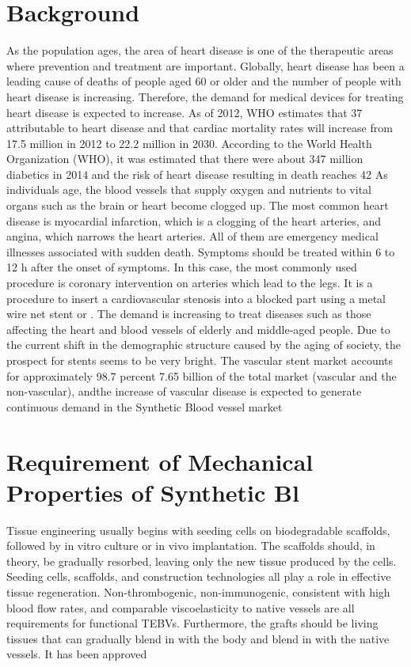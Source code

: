 \documentclass[12pt,letterpaper]{article}
\begin{document}
\begin{Summary}
\section{Background}
As the population ages, the area of heart disease is one of the therapeutic areas where
prevention and treatment are important. Globally, heart disease has been a leading cause of
deaths of people aged 60 or older and the number of people with heart disease is increasing.
Therefore, the demand for medical devices for treating heart disease is expected to increase.
As of 2012, WHO estimates that 37%
attributable to heart disease and that cardiac mortality rates will increase from 17.5 million in
2012 to 22.2 million in 2030. According to the World Health Organization (WHO), it was
estimated that there were about 347 million diabetics in 2014 and the risk of heart disease
resulting in death reaches 42%
As individuals age, the blood vessels that supply oxygen and nutrients to vital organs such as
the brain or heart become clogged up. The most common heart disease is myocardial infarction,
which is a clogging of the heart arteries, and angina, which narrows the heart arteries. All of
them are emergency medical illnesses associated with sudden death. Symptoms should be
treated within 6 to 12 h after the onset of symptoms. In this case, the most commonly used
procedure is coronary intervention on arteries which lead to the legs. It is a procedure to insert a
cardiovascular stenosis into a blocked part using a metal wire net stent or . The demand is
increasing to treat diseases such as those affecting the heart and blood vessels of elderly and
middle-aged people. Due to the current shift in the demographic structure caused by the aging
of society, the prospect for stents seems to be very bright. The vascular stent market accounts
for approximately 98.7 percent  7.65 billion of the total market (vascular and the non-vascular), andthe increase of vascular disease is expected to generate continuous demand in the Synthetic
Blood vessel market
\section{ Requirement of Mechanical Properties of Synthetic Bl }
Tissue engineering usually begins with seeding cells on biodegradable scaffolds, followed by in
vitro culture or in vivo implantation. The scaffolds should, in theory, be gradually resorbed,
leaving only the new tissue produced by the cells. Seeding cells, scaffolds, and construction
technologies all play a role in effective tissue regeneration.
Non-thrombogenic, non-immunogenic, consistent with high blood flow rates, and comparable
viscoelasticity to native vessels are all requirements for functional TEBVs. Furthermore, the
grafts should be living tissues that can gradually blend in with the body and blend in with the
native vessels. It has been approved


\end{Summary}
\end{document}
